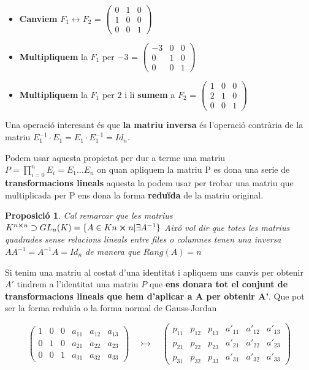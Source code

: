 \documentclass[12pt]{article}
\newtheorem{proposicio}{Proposició}[section]
\begin{document}
\begin{itemize}
    \item \textbf{Canviem} $F_1 \leftrightarrow F_2$ = $ \begin{pmatrix}
0 & 1 & 0 \\
1 & 0 & 0 \\
0 & 0 & 1 
\end{pmatrix}  $

    \item \textbf{Multipliquem} la $F_1$ per $-3$ = $ \begin{pmatrix}
-3 & 0 & 0 \\
0 & 1 & 0 \\
0 & 0 & 1 
\end{pmatrix}  $

    \item \textbf{Multipliquem} la $F_1$ per $2$ i li \textbf{sumem} a $F_2$ = $ \begin{pmatrix}
1 & 0 & 0 \\
2 & 1 & 0 \\
0 & 0 & 1 
\end{pmatrix}  $
\end{itemize}

Una operació interesant és que \textbf{la matriu inversa} és l'operació contrària de la matriu $E^{-1}_1 \cdot E_1 = E_1 \cdot E^{-1}_1 = Id_n$.

Podem usar aquesta propietat per dur a terme una matriu $P = \prod_{i = 0}^{n} E_i = E_{1} \dots E_n$ on quan apliquem la matriu P es dona una serie de \textbf{transformacions lineals} aquesta la podem usar per trobar una matriu que multiplicada per P ens dona la forma \textbf{reduïda} de la matriu original.

\begin{proposicio}
    Cal remarcar que les matrius $K^{n\cross n} \supset GL_n(K) = \{A \in K{n\cross n} | \exists A^{-1}\}$ Aixó vol dir que totes les matrius quadrades sense relacions lineals entre files o columnes tenen una inversa $AA^{-1} = A^{-1}A = Id_n$ de manera que $Rang(A) = n$
\end{proposicio}

Si tenim una matriu al costat d'una identitat i apliquem uns canvis per obtenir $A'$ tindrem a l'identitat una matriu $P$ que \textbf{ens donara tot el conjunt de transformacions lineals que hem d'aplicar a A per obtenir A'}. Que pot ser la forma reduïda o la forma normal de Gauss-Jordan

\[
\left(
\begin{array}{ccc|ccc}
1 & 0 & 0 & a_{11} & a_{12} & a_{13}\\
0 & 1 & 0 & a_{21} & a_{22} & a_{23}\\
0 & 0 & 1 & a_{31} & a_{32} & a_{33}
\end{array}
\right)
\quad\rightarrowtail \quad
\left(
\begin{array}{ccc|ccc}
p_{11} & p_{12} & p_{13} & a'_{11} & a'_{12} & a'_{13}\\
p_{21} & p_{22} & p_{23} & a'_{21} & a'_{22} & a'_{23}\\
p_{31} & p_{32} & p_{33} & a'_{31} & a'_{32} & a'_{33}
\end{array}
\right)
\]
\end{document}
